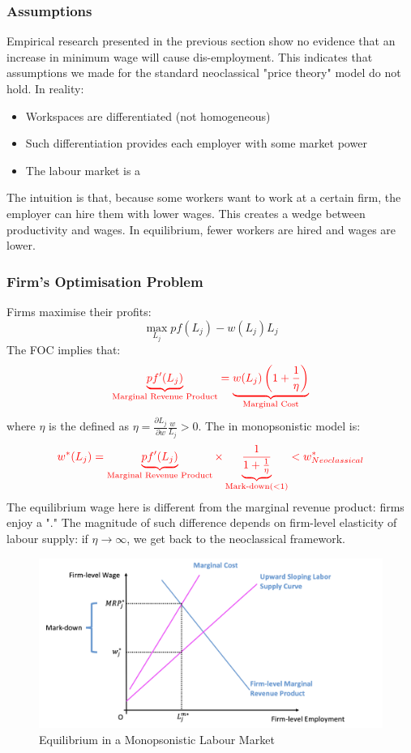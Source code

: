         \subsubsection{Assumptions}
            Empirical research presented in the previous section show no evidence that an increase in minimum wage will cause dis-employment. This indicates that assumptions we made for the standard neoclassical "price theory" model do not hold. In reality:
            \begin{itemize}
                \item Workspaces are differentiated (not homogeneous)
                \item Such differentiation provides each employer with some market power
                \item The labour market is a 
            \end{itemize}
            The intuition is that, because some workers want to work at a certain firm, the employer can hire them with lower wages. This creates a wedge between productivity and wages. In equilibrium, fewer workers are hired and wages are lower.
            
        \subsubsection{Firm's Optimisation Problem}
            Firms maximise their profits:
            $$\max_{L_j} pf(L_j) - w(L_j)L_j$$
            The FOC implies that:
            $$\color{red} \underbrace{pf'(L_j)}_{\text{Marginal\ Revenue\ Product}} = \underbrace{w(L_j)\left(1+\frac{1}{\eta}\right)}_{\text{Marginal\ Cost}}$$
            where $\eta$ is the  defined as $\eta = \frac{\partial L_j}{\partial w}\frac{w}{L_j} > 0$.
            The  in monopsonistic model is:
            $$\color{red} w^*(L_j)= \underbrace{pf'(L_j)}_{\text{Marginal\ Revenue\ Product}} \times \underbrace{\frac{1}{1+\frac{1}{\eta}}}_{\text{Mark-down}(<1)} < w^*_{Neoclassical}$$
            The equilibrium wage here is different from the marginal revenue product: firms enjoy a "." The magnitude of such difference depends on firm-level elasticity of labour supply: if $\eta \rightarrow \infty$, we get back to the neoclassical framework.
            \begin{figure}[H]
                \centering
                \includegraphics[width=5in]{images/ch2/Monop_LM_1.png}
                \caption{Equilibrium in a Monopsonistic Labour Market}
            \end{figure}
            
